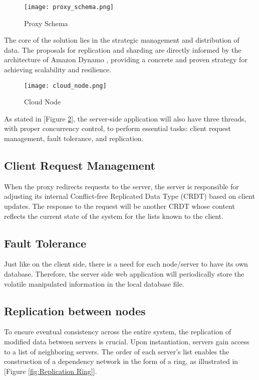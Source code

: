 \documentclass[sigconf, authorversion, nonacm]{acmart}
\begin{document}
\begin{figure}[H]
    \centering
    \texttt{[image: proxy\_schema.png]}
    \caption{Proxy Schema}
    \label{fig:Proxy Schema}
\end{figure}

The core of the solution lies in the strategic management and distribution of data. The proposals for replication and sharding are directly informed by the architecture of Amazon Dynamo \cite{amazondynamo}, providing a concrete and proven strategy for achieving scalability and resilience.

\begin{figure}[H]
    \centering
    \texttt{[image: cloud\_node.png]}
    \caption{Cloud Node}
    \label{fig:Cloud Node}
\end{figure}

As stated in [Figure \ref{fig:Cloud Node}], the server-side application will also have three threads, with proper concurrency control, to perform essential tasks: client request management, fault tolerance, and replication.

\subsection{Client Request Management}
When the proxy redirects requests to the server, the server is responsible for adjusting its internal Conflict-free Replicated Data Type (CRDT) \cite{crdt} based on client updates. The response to the request will be another CRDT whose content reflects the current state of the system for the lists known to the client.

\subsection{Fault Tolerance}
Just like on the client side, there is a need for each node/server to have its own database. Therefore, the server side web application will periodically store the volatile manipulated information in the local database file.

\subsection{Replication between nodes}

To ensure eventual consistency across the entire system, the replication of modified data between servers is crucial. Upon instantiation, servers gain access to a list of neighboring servers. The order of each server's list enables the construction of a dependency network in the form of a ring, as illustrated in [Figure \ref{fig:Replication Ring}].
\end{document}
